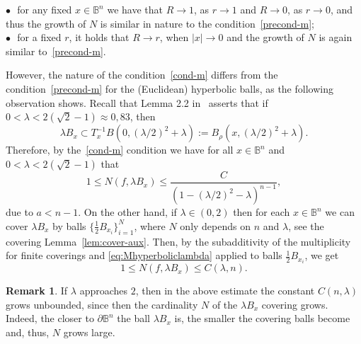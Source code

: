 \documentclass[11pt,a4paper,reqno]{amsart}
\theoremstyle{definition}
\newtheorem{remark}[theorem]{Remark}
\newcommand{\B}{\mathbb{B}^n}
\newcommand{\blue}{\color{blau}}
\newcommand{\kom}[1]{}
\renewcommand{\kom}[1]{{\bf \blue /#1/}}
\numberwithin{komcounter}{section}
\begin{document}
 $\bullet$\,\, for any fixed $x\in \B$ we have that $R\to 1$, as $r\to 1$ and $R\to 0$, as $r\to 0$, and thus the growth of $N$ is similar in nature to the condition~\eqref{precond-m}; \\
\indent $\bullet$\,\, for a fixed $r$, it holds that $R\to r$, when $|x|\to 0$ and the growth of $N$ is again similar to~\eqref{precond-m}.
\medskip

However, the nature of the condition~\eqref{cond-m} differs from the condition~\eqref{precond-m} for the (Euclidean) hyperbolic balls, as the following observation shows. Recall that Lemma 2.2 in~\cite{ag2} asserts that if $0<\lambda<2(\sqrt{2}-1)\approx 0,83$, then
\[
 \lambda B_x \subset T_x^{-1} B\left(0, \left(\lambda/2\right)^2+\lambda\right):=B_\rho\left(x, \left(\lambda/2\right)^2+\lambda\right).
\]  
Therefore, by the~\eqref{cond-m} condition we have for all $x\in \B$ and $0<\lambda<2(\sqrt 2 -1)$ that
\begin{equation}\label{eq:Mhyperboliclambda}
1\leq N(f, \lambda B_x)\leq \frac{C}{(1-(\lambda/2)^2-\lambda)^{n-1}}, 
\end{equation}
due to $a<n-1$. On the other hand, if $\lambda\in (0,2)$ then for each $x\in\B$ we can cover $\lambda B_x$ by balls $\{\frac{1}{2}B_{x_i}\}_{i=1}^N$, where $N$ only depends on $n$ and $\lambda$, see the covering Lemma~\ref{lem:cover-aux}. Then, by the subadditivity of the multiplicity for finite coverings and \eqref{eq:Mhyperboliclambda} applied to balls $\frac{1}{2}B_{x_i}$, we get
\begin{equation}\label{eq:Mhyperbolic}
	1\leq N(f, \lambda B_x)\leq C(\lambda ,n).
\end{equation}
\begin{remark}
If $\lambda$ approaches $2$, then in the above estimate the constant $C(n,\lambda)$ grows unbounded, since then the cardinality $N$ of the $\lambda B_x$ covering grows. Indeed, the closer to $\partial \B$ the ball $\lambda B_x$ is, the smaller the covering balls become and, thus, $N$ grows large.
\end{remark}

\smallskip
\end{document}
